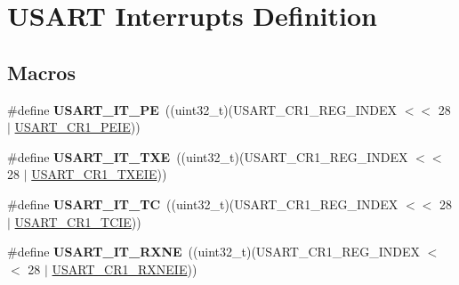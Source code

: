 \hypertarget{group___u_s_a_r_t___interrupt__definition}{}\section{U\+S\+A\+RT Interrupts Definition}
\label{group___u_s_a_r_t___interrupt__definition}
\subsection*{Macros}
\begin{DoxyCompactItemize}
\item 
\#define {\bfseries U\+S\+A\+R\+T\+\_\+\+I\+T\+\_\+\+PE}~((uint32\+\_\+t)(U\+S\+A\+R\+T\+\_\+\+C\+R1\+\_\+\+R\+E\+G\+\_\+\+I\+N\+D\+EX $<$$<$ 28 $\vert$ \hyperlink{group___peripheral___registers___bits___definition_ga27405d413b6d355ccdb076d52fef6875}{U\+S\+A\+R\+T\+\_\+\+C\+R1\+\_\+\+P\+E\+IE}))\hypertarget{group___u_s_a_r_t___interrupt__definition_gae607c28a462c224c575b7541dc4f7067}{}\label{group___u_s_a_r_t___interrupt__definition_gae607c28a462c224c575b7541dc4f7067}

\item 
\#define {\bfseries U\+S\+A\+R\+T\+\_\+\+I\+T\+\_\+\+T\+XE}~((uint32\+\_\+t)(U\+S\+A\+R\+T\+\_\+\+C\+R1\+\_\+\+R\+E\+G\+\_\+\+I\+N\+D\+EX $<$$<$ 28 $\vert$ \hyperlink{group___peripheral___registers___bits___definition_ga70422871d15f974b464365e7fe1877e9}{U\+S\+A\+R\+T\+\_\+\+C\+R1\+\_\+\+T\+X\+E\+IE}))\hypertarget{group___u_s_a_r_t___interrupt__definition_gab18d0fe889204a4c34f6d5817fb5147d}{}\label{group___u_s_a_r_t___interrupt__definition_gab18d0fe889204a4c34f6d5817fb5147d}

\item 
\#define {\bfseries U\+S\+A\+R\+T\+\_\+\+I\+T\+\_\+\+TC}~((uint32\+\_\+t)(U\+S\+A\+R\+T\+\_\+\+C\+R1\+\_\+\+R\+E\+G\+\_\+\+I\+N\+D\+EX $<$$<$ 28 $\vert$ \hyperlink{group___peripheral___registers___bits___definition_gaa17130690a1ca95b972429eb64d4254e}{U\+S\+A\+R\+T\+\_\+\+C\+R1\+\_\+\+T\+C\+IE}))\hypertarget{group___u_s_a_r_t___interrupt__definition_ga748e86162cc110513330079982821c39}{}\label{group___u_s_a_r_t___interrupt__definition_ga748e86162cc110513330079982821c39}

\item 
\#define {\bfseries U\+S\+A\+R\+T\+\_\+\+I\+T\+\_\+\+R\+X\+NE}~((uint32\+\_\+t)(U\+S\+A\+R\+T\+\_\+\+C\+R1\+\_\+\+R\+E\+G\+\_\+\+I\+N\+D\+EX $<$$<$ 28 $\vert$ \hyperlink{group___peripheral___registers___bits___definition_ga91118f867adfdb2e805beea86666de04}{U\+S\+A\+R\+T\+\_\+\+C\+R1\+\_\+\+R\+X\+N\+E\+IE}))\hypertarget{group___u_s_a_r_t___interrupt__definition_gacdd49b93072655a21a63a35e6431f8ae}{}\label{group___u_s_a_r_t___interrupt__definition_gacdd49b93072655a21a63a35e6431f8ae}


\end{DoxyCompactItemize}
